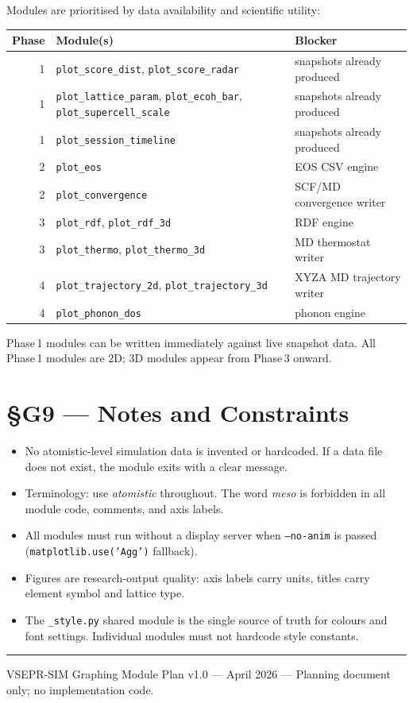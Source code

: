 \documentclass[11pt,a4paper]{article}
\begin{document}
Modules are prioritised by data availability and scientific utility:

\begin{center}
\begin{tabular}{rll}
\toprule
Phase & Module(s) & Blocker \\
\midrule
1 & \texttt{plot\_score\_dist}, \texttt{plot\_score\_radar}         & snapshots already produced \\
1 & \texttt{plot\_lattice\_param}, \texttt{plot\_ecoh\_bar},
    \texttt{plot\_supercell\_scale}                                  & snapshots already produced \\
1 & \texttt{plot\_session\_timeline}                                 & snapshots already produced \\
2 & \texttt{plot\_eos}                                               & EOS CSV engine \\
2 & \texttt{plot\_convergence}                                       & SCF/MD convergence writer \\
3 & \texttt{plot\_rdf}, \texttt{plot\_rdf\_3d}                      & RDF engine \\
3 & \texttt{plot\_thermo}, \texttt{plot\_thermo\_3d}                & MD thermostat writer \\
4 & \texttt{plot\_trajectory\_2d}, \texttt{plot\_trajectory\_3d}    & XYZA MD trajectory writer \\
4 & \texttt{plot\_phonon\_dos}                                       & phonon engine \\
\bottomrule
\end{tabular}
\end{center}

Phase\,1 modules can be written immediately against live snapshot data.
All Phase\,1 modules are 2D; 3D modules appear from Phase\,3 onward.

\section{\S{}G9 --- Notes and Constraints}

\begin{itemize}[leftmargin=2em]
  \item No atomistic-level simulation data is invented or hardcoded.
        If a data file does not exist, the module exits with a clear message.
  \item Terminology: use \emph{atomistic} throughout.
        The word \emph{meso} is forbidden in all module code, comments, and axis labels.
  \item All modules must run without a display server when \texttt{--no-anim}
        is passed (\texttt{matplotlib.use('Agg')} fallback).
  \item Figures are research-output quality: axis labels carry units,
        titles carry element symbol and lattice type.
  \item The \texttt{\_style.py} shared module is the single source of truth
        for colours and font settings.
        Individual modules must not hardcode style constants.
\end{itemize}

\vspace{2em}
\hrule
\vspace{0.5em}
{\small\color{dim}%
VSEPR-SIM Graphing Module Plan v1.0 ---
April 2026 ---
Planning document only; no implementation code.
}
\end{document}
